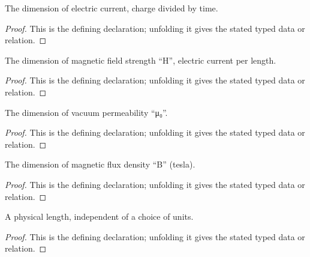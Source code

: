 \begin{definition}[electricCurrentDimension]
  \label{decl:physics:IPhO_2026_3_A_1:electricCurrentDimension}
  The dimension of electric current, charge divided by time.
\end{definition}
\begin{proof}
  This is the defining declaration; unfolding it gives the stated typed data or relation.
\end{proof}

\begin{definition}[magneticFieldStrengthDimension]
  \label{decl:physics:IPhO_2026_3_A_1:magneticFieldStrengthDimension}
  The dimension of magnetic field strength “H”, electric current per length.
\end{definition}
\begin{proof}
  This is the defining declaration; unfolding it gives the stated typed data or relation.
\end{proof}

\begin{definition}[vacuumPermeabilityDimension]
  \label{decl:physics:IPhO_2026_3_A_1:vacuumPermeabilityDimension}
  The dimension of vacuum permeability “μ₀”.
\end{definition}
\begin{proof}
  This is the defining declaration; unfolding it gives the stated typed data or relation.
\end{proof}

\begin{definition}[magneticFluxDensityDimension]
  \label{decl:physics:IPhO_2026_3_A_1:magneticFluxDensityDimension}
  The dimension of magnetic flux density “B” (tesla).
\end{definition}
\begin{proof}
  This is the defining declaration; unfolding it gives the stated typed data or relation.
\end{proof}

\begin{definition}[PhysicalLength]
  \label{decl:physics:IPhO_2026_3_A_1:PhysicalLength}
  A physical length, independent of a choice of units.
\end{definition}
\begin{proof}
  This is the defining declaration; unfolding it gives the stated typed data or relation.
\end{proof}

